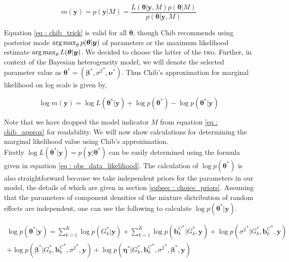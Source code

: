 \begin{equation}
\label{eq : chib_trick}
m(\boldsymbol{y}) = p(\boldsymbol{y}|M) = \dfrac {L(\boldsymbol{\theta}|\boldsymbol{y}, M) p(\boldsymbol{\theta}|M)} {p(\boldsymbol{\theta}|\boldsymbol{y}, M)}
\end{equation}

Equation \ref{eq : chib_trick} is valid for all $\boldsymbol{\theta}$, though Chib recommends using posterior mode $\operatorname*{arg\,max}_\theta p(\boldsymbol{\theta}|\boldsymbol{y})$ of parameters or the maximum likelihood estimate $\operatorname*{arg\,max}_\theta L(\boldsymbol{\theta}|\boldsymbol{y})$. We decided to choose the latter of the two. Further, in context of the Bayesian heterogeneity model, we will denote the selected parameter value as 
$\boldsymbol{\theta}^*=(\boldsymbol{\beta}^*, {\sigma^2}^*, \boldsymbol{\nu}^*)$. Thus Chib's approximation for marginal likelihood on log scale is given by,

\begin{equation}
\label{eq : chib_approx}
\log{\hat{m}(\boldsymbol{y})} = \log{L(\boldsymbol{\theta}^*|\boldsymbol{y})} + \log{p(\boldsymbol{\theta}^*)} - \log{p(\boldsymbol{\theta}^*|\boldsymbol{y})}
\end{equation}

Note that we have dropped the model indicator $M$ from equation \ref{eq : chib_approx} for readability. We will now show calculations for determining the marginal likelihood value using Chib's approximation.\\ 

Firstly $\log{L(\boldsymbol{\theta}^*|\boldsymbol{y})} = p(\boldsymbol{y}|\boldsymbol{\theta}^*)$ can be easily determined using the formula given in equation \ref{eq : obs_data_likelihood}. The calculation of $\log{p(\boldsymbol{\theta}^*)}$ is also straightforward because we take independent priors for the parameters in our model, the details of which are given in section \ref{subsec : choice_priors}. Assuming that the parameters of component densities of the mixture distribution of random effects are independent, one can use the following to calculate $\log{p(\boldsymbol{\theta}^*|\boldsymbol{y})}$.

\begin{multline}
\log{p(\boldsymbol{\theta}^*|\boldsymbol{y})} = 
\sum_{k=1}^K{\log{p(G_k^*|\boldsymbol{y})}} + 
\sum_{k=1}^K{\log{p({\boldsymbol{b}_k^C}^*|G_k^*, \boldsymbol{y})}} + 
\log{p({\sigma^2}^*|G_k^*, {\boldsymbol{b}_k^C}^*, \boldsymbol{y})}\\
+ \log{p({\boldsymbol{\beta}}^*|G_k^*, {\boldsymbol{b}_k^C}^*, {\sigma^2}^*, \boldsymbol{y})} + 
\log{p({\boldsymbol{\eta}}^*|G_k^*, {\boldsymbol{b}_k^C}^*, {\sigma^2}^*,{\boldsymbol{\beta}}^*, \boldsymbol{y})}
\end{multline}

